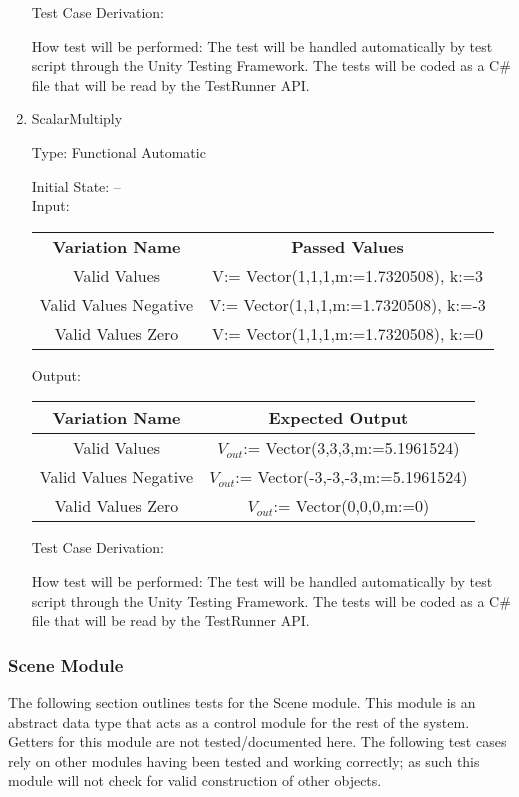 \documentclass[12pt, titlepage]{article}
\begin{document}
\begin{enumerate}
	Test Case Derivation: 
	
	How test will be performed: The test will be handled automatically by test 
	script through the Unity Testing Framework. The tests will be coded as a 
	C\# file that will be read by the TestRunner API.
	
	\item{ScalarMultiply\\}
	
	Type: Functional Automatic
	
	Initial State: -- \\
	
	Input: 
	\begin{tabular}{|c|c|}
		\hline
		\textbf{Variation Name} & \textbf{Passed Values}\\
		Valid Values & V:= Vector(1,1,1,m:=1.7320508), k:=3 \\
		Valid Values Negative & V:= Vector(1,1,1,m:=1.7320508), k:=-3 \\
		Valid Values Zero & V:= Vector(1,1,1,m:=1.7320508), k:=0\\				
		\hline
		
		\hline
	\end{tabular}
	
	Output:
	\begin{tabular}{|c|c|}
		\hline
		\textbf{Variation Name} & \textbf{Expected Output}\\
		\hline
		Valid Values & $V_{out}$:= Vector(3,3,3,m:=5.1961524)\\		
		Valid Values Negative & $V_{out}$:= Vector(-3,-3,-3,m:=5.1961524)\\	
		Valid Values Zero & $V_{out}$:= 
		Vector(0,0,0,m:=0)\\						
		\hline
	\end{tabular}
	
	Test Case Derivation: 
	
	How test will be performed: The test will be handled automatically by test 
	script through the Unity Testing Framework. The tests will be coded as a 
	C$\#$ file that will be read by the TestRunner API.  
	
\end{enumerate}

\subsubsection{Scene Module}
The following section outlines tests for the Scene module. This module is an 
abstract data type that acts as a control module for the rest of the system. 
Getters for this module are not tested/documented here. The following test 
cases rely on other modules having been tested and working correctly; as such 
this module will not check for valid construction of other objects.
\end{document}
